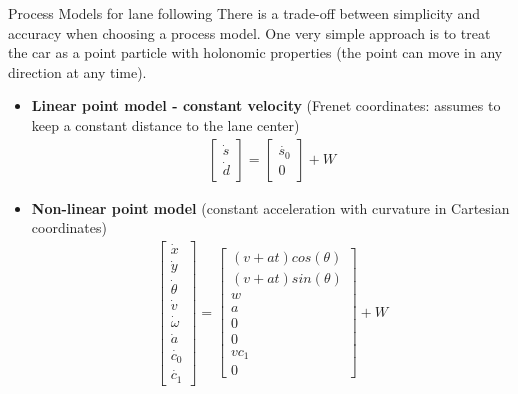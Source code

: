 \documentclass[10pt,mathserif]{beamer}
\begin{document}
\begin{frame}{Process Models for lane following}
There is a trade-off between simplicity and accuracy when choosing a process model. One very simple
approach is to treat the car as a point particle with holonomic properties (the point can move in 
any direction at any time).
\begin{itemize}
\item \textbf{Linear point model - constant velocity} (Frenet coordinates: assumes to keep a
constant distance to the lane center) 
\begin{align}
\begin{bmatrix}
\dot{s} \\ \dot{d}
\end{bmatrix} = 
\begin{bmatrix}
\dot{s_0} \\ 0
\end{bmatrix} + W
\end{align}
\item \textbf{Non-linear point model} (constant acceleration with curvature in Cartesian coordinates)
\begin{align}
\begin{bmatrix}
\dot{x} \\ \dot{y} \\ \dot{\theta}\\ \dot{v} \\ \dot{\omega}\\ \dot{a} \\ \dot{c_0} \\ \dot{c_1}
\end{bmatrix} =
\begin{bmatrix}
(v+at)cos(\theta) \\ (v+at)sin(\theta) \\ w\\ a\\ 0\\0\\ vc_1\\0
\end{bmatrix} + W
\end{align}
\end{itemize}
\end{frame}
\end{document}
